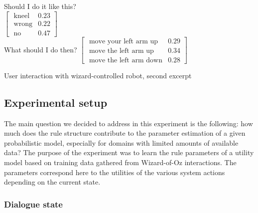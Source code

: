 \begin{Transcript}[p!]
\begin{dialogue}
 \vspace{3mm}
 Should I do it like this? \\
 $\begin{bmatrix}\text{ kneel} & 0.23 \\
\text{ wrong} & 0.22 \\
\text{ no} & 0.47 \end{bmatrix}$ \vspace{3mm} \\
 \vspace{2mm}
 What should I do then?  \vspace{3mm}
 $\begin{bmatrix}\text{ move your left arm up} & 0.29 \\
\text{ move the left arm up} & 0.34 \\
\text{ move the left arm down} & 0.28 \end{bmatrix}$ \vspace{3mm} \\
\end{dialogue}
\vspace{-4mm} \hspace{1cm}  \vspace{3mm}
\caption{User interaction with wizard-controlled robot, second excerpt}
\end{Transcript}

\subsection{Experimental setup}
\label{sec:wozlearning-experiments-setup}

The main question we decided to address in this experiment is the following: how much does the rule structure contribute to the parameter estimation of a given probabilistic model, especially for domains with limited amounts of available data?  The purpose of the experiment was to learn the rule parameters of a utility model based on training data gathered from Wizard-of-Oz interactions. The parameters correspond here to the utilities of the various system actions depending on the current state.


\subsubsection*{Dialogue state}

